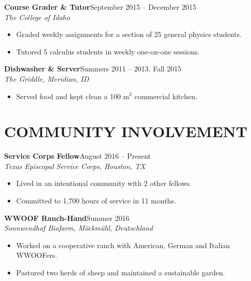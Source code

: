 \documentclass[margin]{res}
\newcommand\job[3]{\textbf{#1}\hfill {#2}\\ \emph{#3} }
\newenvironment{details}{\begin{itemize}[itemsep=0.6pt,topsep=2.2pt] }{\end{itemize} }
\begin{document}
\begin{resume}
\job{Course Grader \& Tutor}{September 2015 -- December 2015}{The College of Idaho}
	\begin{details}
        \item Graded weekly assignments for a section of 25 general physics students.
        \item Tutored 5 calculus students in weekly one-on-one sessions.
    \end{details}
              
\job{Dishwasher \& Server}{Summers 2011 -- 2013, Fall 2015}{The Griddle, Meridian, ID}
    \begin{details}
        \item Served food and kept clean a 100 $\mathrm{m}^2$ commercial kitchen.
    \end{details}    
   
\section{COMMUNITY INVOLVEMENT}
\job{Service Corps Fellow}{August 2016 -- Present}{Texas Episcopal Service Corps, Houston, TX}
	\begin{details}
    	\item Lived in an intentional community with 2 other fellows.
    	\item Committed to 1,700 hours of service in 11 months.
	\end{details}
            
\job{WWOOF Ranch-Hand}{Summer 2016}{Sonnwendhof Biofarm, M\"{o}ckm\"{u}hl, Deutschland}
    	\begin{details}
    		\item Worked on a cooperative ranch with American, German and Italian WWOOFers.
            \item Pastured two herds of sheep and maintained a sustainable garden.
     	\end{details}
            

\end{resume}
\end{document}
